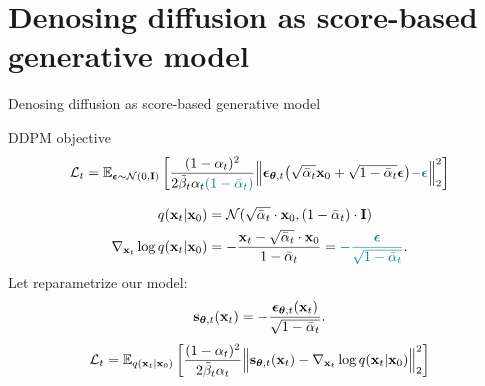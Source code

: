 \section{Denosing diffusion as score-based generative model}
\begin{frame}{Denosing diffusion as score-based generative model}
	\begin{block}{DDPM objective}
		\vspace{-0.5cm}
		\[
			\mathcal{L}_t = \mathbb{E}_{\boldsymbol{\epsilon} \sim \mathcal{N}(0, \mathbf{I})} \left[ \frac{(1 - \alpha_t)^2}{2\tilde{\beta}_t \alpha_t  {\color{teal}(1 - \bar{\alpha}_t)}}  \Bigl\|  \boldsymbol{\epsilon}_{\boldsymbol{\theta}, t}\bigl( \sqrt{\bar{\alpha}_t} \mathbf{x}_0 + \sqrt{1 - \bar{\alpha}_t} \boldsymbol{\epsilon}\bigr) {\color{teal} - \boldsymbol{\epsilon}}\Bigr\|_2^2  \right]
		\]
		\vspace{-0.7cm}
	\end{block}
	\vspace{-0.5cm}
	\begin{align*}
		q(\mathbf{x}_t | \mathbf{x}_0) &= \mathcal{N}(\sqrt{\bar{\alpha}_t} \cdot \mathbf{x}_0, (1 - \bar{\alpha}_t) \cdot \mathbf{I}) \\
		\nabla_{\mathbf{x}_t} \log q(\mathbf{x}_t | \mathbf{x}_0) &= - \frac{\mathbf{x}_t - \sqrt{\bar{\alpha}_t} \cdot \mathbf{x}_0}{1 - \bar{\alpha}_t} = {\color{teal}-  \frac{\boldsymbol{\epsilon}}{\sqrt{1 - \bar{\alpha}_t}}}.
	\end{align*}
		Let reparametrize our model: 
		\vspace{-0.2cm}
		\[
			\mathbf{s}_{\boldsymbol{\theta}, t}(\mathbf{x}_t) = - \frac{\boldsymbol{\epsilon}_{\boldsymbol{\theta}, t}(\mathbf{x}_t)}{\sqrt{1 - \bar{\alpha}_t}}.
		\]
		\[
			\mathcal{L}_t = \mathbb{E}_{q(\mathbf{x}_t | \mathbf{x}_0)} \left[ \frac{(1 - \alpha_t)^2}{2\tilde{\beta}_t \alpha_t}  \Bigl\|  \mathbf{s}_{\boldsymbol{\theta}, t} (\mathbf{x}_t) - \nabla_{\mathbf{x}_t} \log q(\mathbf{x}_t | \mathbf{x}_0) \Bigr\|_2^2  \right]
		\]
	\end{frame}

